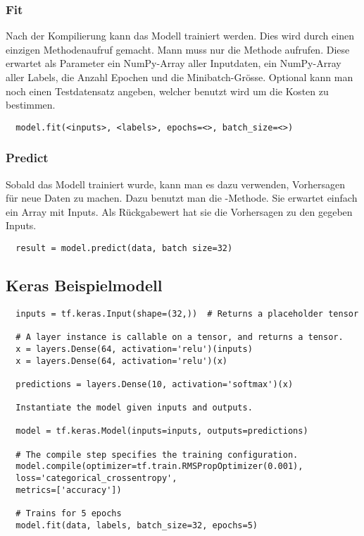 \subsubsection{Fit}
Nach der Kompilierung kann das Modell trainiert werden. Dies wird durch einen
einzigen Methodenaufruf gemacht. Mann muss nur die  Methode aufrufen.
Diese erwartet als Parameter ein NumPy-Array aller Inputdaten, ein NumPy-Array
aller Labels, die Anzahl Epochen und die Minibatch-Grösse.
Optional kann man noch einen Testdatensatz angeben, welcher benutzt wird um die
Kosten zu bestimmen.
\begin{verbatim}
  model.fit(<inputs>, <labels>, epochs=<>, batch_size=<>)
\end{verbatim}

\subsubsection{Predict}
Sobald das Modell trainiert wurde, kann man es dazu verwenden, Vorhersagen für
neue Daten zu machen. Dazu benutzt man die -Methode. Sie erwartet
einfach ein Array mit Inputs. Als Rückgabewert hat sie die Vorhersagen zu den
gegeben Inputs.

\begin{verbatim}
  result = model.predict(data, batch size=32)
\end{verbatim}

\subsection{Keras Beispielmodell}

\begin{verbatim}
  inputs = tf.keras.Input(shape=(32,))  # Returns a placeholder tensor

  # A layer instance is callable on a tensor, and returns a tensor.
  x = layers.Dense(64, activation='relu')(inputs)
  x = layers.Dense(64, activation='relu')(x)

  predictions = layers.Dense(10, activation='softmax')(x)

  Instantiate the model given inputs and outputs.

  model = tf.keras.Model(inputs=inputs, outputs=predictions)

  # The compile step specifies the training configuration.
  model.compile(optimizer=tf.train.RMSPropOptimizer(0.001),
  loss='categorical_crossentropy',
  metrics=['accuracy'])

  # Trains for 5 epochs
  model.fit(data, labels, batch_size=32, epochs=5)
\end{verbatim}


